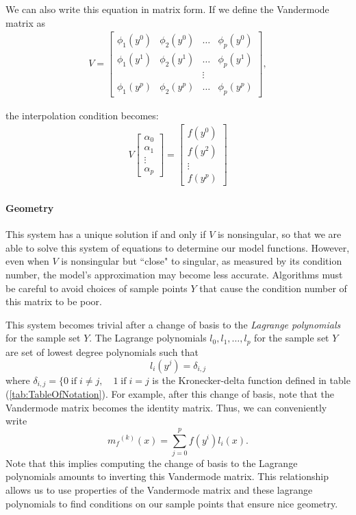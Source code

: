 \documentclass{article}
\theoremstyle{case}
\newcommand{\modelk}{{{m}_f}^{(k)}}
\let\oldref\ref
\renewcommand{\ref}[1]{(\oldref{#1})}
\begin{document}
We can also write this equation in matrix form.
If we define the Vandermode matrix as
\begin{align}
\label{vandermonde}
V=
\begin{bmatrix}
    \phi_1(y^0)      & \phi_2(y^0)       & \ldots & \phi_{p}(y^0)      \\
    \phi_1(y^1)      & \phi_2(y^1)       & \dots  & \phi_{p}(y^1)      \\
                     &                   & \vdots &                    \\
    \phi_1(y^{p})    & \phi_2(y^{p})     & \ldots & \phi_{p}(y^{p})
\end{bmatrix},
\end{align}

the interpolation condition becomes:
\begin{align}
V
\begin{bmatrix}
    \alpha_0     \\
    \alpha_1     \\
    \vdots       \\
    \alpha_p
\end{bmatrix}
=
\begin{bmatrix}
    f(y^0)     \\
    f(y^2)     \\
    \vdots     \\
    f(y^p)
\end{bmatrix}
\end{align}

\paragraph{Geometry}
This system has a unique solution if and only if $V$ is nonsingular, so that we are able to solve this system of equations to determine our model functions.
However, even when $V$ is nonsingular but ``close" to singular, as measured by its condition number, the model's approximation may become less accurate.
Algorithms must be careful to avoid choices of sample points $Y$ that cause the condition number of this matrix to be poor.

This system becomes trivial after a change of basis to the \emph{Lagrange polynomials} for the sample set $Y$.
The Lagrange polynomials $l_0, l_1, \ldots, l_p$ for the sample set $Y$ are set of lowest degree polynomials such that
\[
l_i(y^j) = \delta_{i,j}
\]
where $\delta_{i,j} = \{0 \;\text{if}\; i\ne j,\quad 1 \;\text{if} \; i = j $ is the Kronecker-delta function defined in table \ref{tab:TableOfNotation}.
For example, after this change of basis, note that the Vandermode matrix becomes the identity matrix.
Thus, we can conveniently write
\[
\label{reg}
\modelk(x) = \sum^p_{j=0}f(y^i)l_i(x).
\]
Note that this implies computing the change of basis to the Lagrange polynomials amounts to inverting this Vandermode matrix.
This relationship allows us to use properties of the Vandermode matrix and these lagrange polynomials to find conditions on our sample points that ensure nice geometry.
\end{document}
